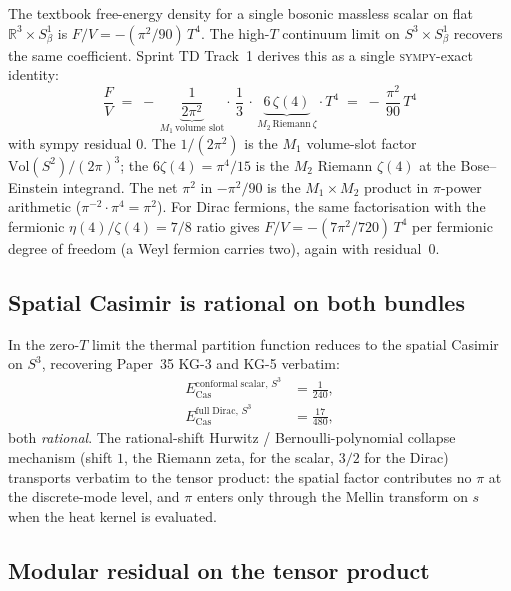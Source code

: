 \documentclass[11pt]{article}
\begin{document}
The textbook free-energy density for a single bosonic massless scalar
on flat $\mathbb{R}^3 \times S^1_\beta$ is
$F/V = -(\pi^2/90)\,T^4$.  The high-$T$ continuum limit on
$S^3 \times S^1_\beta$ recovers the same coefficient.  Sprint TD
Track~1 derives this as a single \textsc{sympy}-exact identity:
\begin{equation}
\label{eq:sb_factorization}
\frac{F}{V}
\;=\; -\,\underbrace{\frac{1}{2\pi^2}}_{M_1\,\text{volume slot}}
       \cdot\, \frac{1}{3}\,
       \cdot\, \underbrace{6\,\zeta(4)}_{M_2\,\text{Riemann}\,\zeta} \cdot T^4
\;=\; -\,\frac{\pi^2}{90}\,T^4
\end{equation}
with sympy residual $0$.  The $1/(2\pi^2)$ is the $M_1$ volume-slot
factor $\mathrm{Vol}(S^2)/(2\pi)^3$; the $6\zeta(4) = \pi^4/15$
is the $M_2$ Riemann $\zeta(4)$ at the Bose--Einstein integrand.  The
net $\pi^2$ in $-\pi^2/90$ is the $M_1\times M_2$ product in
$\pi$-power arithmetic ($\pi^{-2} \cdot \pi^4 = \pi^2$).  For Dirac
fermions, the same factorisation with the fermionic
$\eta(4)/\zeta(4) = 7/8$ ratio gives $F/V = -(7\pi^2/720)\,T^4$ per
fermionic degree of freedom (a Weyl fermion carries two), again with
residual~$0$.

\subsection{Spatial Casimir is rational on both bundles}
\label{subsec:tensor_spatial_casimir}

In the zero-$T$ limit the thermal partition function reduces to the
spatial Casimir on $S^3$, recovering Paper~35 KG-3 and KG-5 verbatim:
\begin{align*}
E_{\mathrm{Cas}}^{\mathrm{conformal\;scalar},\,S^3} &= \tfrac{1}{240}, \\
E_{\mathrm{Cas}}^{\mathrm{full\;Dirac},\,S^3} &= \tfrac{17}{480},
\end{align*}
both \emph{rational}.  The rational-shift Hurwitz / Bernoulli-polynomial
collapse mechanism (shift $1$, the Riemann zeta, for the scalar, $3/2$ for the Dirac)
transports verbatim to the tensor
product: the spatial factor contributes no $\pi$ at the discrete-mode
level, and $\pi$ enters only through the Mellin transform on $s$ when
the heat kernel is evaluated.

\subsection{Modular residual on the tensor product}
\label{subsec:tensor_modular}
\end{document}
